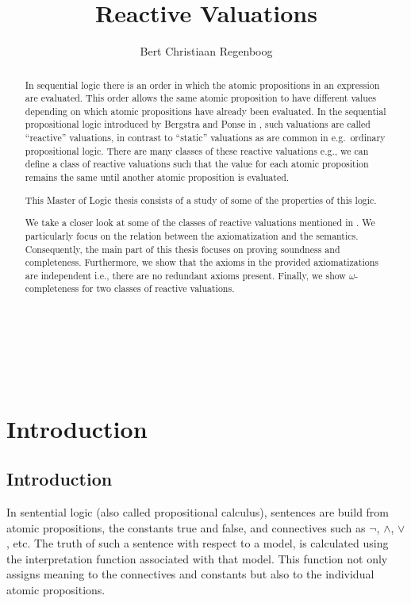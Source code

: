 \documentclass[a4paper,twoside,openright]{report}
\title{Reactive Valuations}
\author{Bert Christiaan Regenboog}
\begin{document}
\maketitle
\thispagestyle{empty}
~\newpage

\tableofcontents

\begin{abstract}
In sequential logic there is an order in which the atomic propositions
in an expression are evaluated. This order allows the same atomic proposition
to have different values depending on which atomic propositions have
already been evaluated. In the sequential propositional logic
introduced by Bergstra and Ponse in \cite{main}, such valuations are
called ``reactive'' valuations, in contrast to ``static'' valuations as
are common in e.g.\ ordinary propositional logic. There are many
classes of these reactive valuations e.g., we can define a class of
reactive valuations such that the value for each atomic proposition
remains the same until another atomic proposition is evaluated.

This Master of Logic thesis consists of a study of some of the properties of
this logic.

We take a closer look at some of the classes of reactive valuations mentioned in \cite{main}. We particularly focus on the relation between the axiomatization and the semantics. Consequently, the main part of this thesis focuses on proving soundness and completeness. Furthermore, we show that the axioms in the provided axiomatizations are independent i.e., there are no redundant axioms present. Finally, we show $\omega$-completeness for two classes of reactive valuations.

\end{abstract}

\thispagestyle{empty}
~\newpage


\chapter{Introduction}

\section{Introduction}
In sentential logic (also called propositional calculus), sentences are build from atomic propositions, the constants true and false, and connectives such as $\neg$, $\wedge$, $\vee$, etc. The truth of such a sentence with respect to a model, is calculated using the interpretation function associated with that model. This function not only assigns meaning to the connectives and constants but also to the individual atomic propositions.
\end{document}
